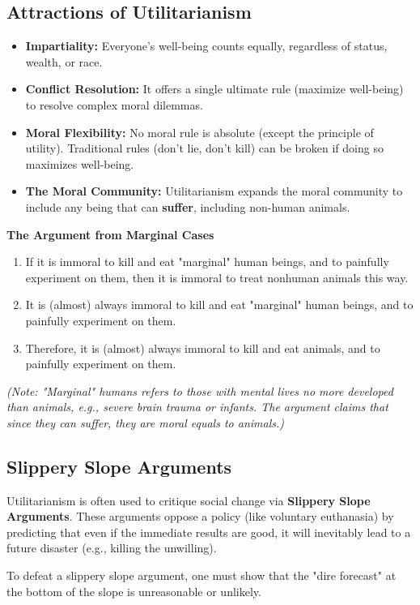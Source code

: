 \subsection{Attractions of Utilitarianism}

\begin{readingnotes}
	\begin{itemize}
		\item \textbf{Impartiality:} Everyone's well-being counts equally, regardless of status, wealth, or race.
		\item \textbf{Conflict Resolution:} It offers a single ultimate rule (maximize well-being) to resolve complex moral dilemmas.
		\item \textbf{Moral Flexibility:} No moral rule is absolute (except the principle of utility). Traditional rules (don't lie, don't kill) can be broken if doing so maximizes well-being.
		\item \textbf{The Moral Community:} Utilitarianism expands the moral community to include any being that can \textbf{suffer}, including non-human animals.
	\end{itemize}
\end{readingnotes}

\begin{argument}
	\textbf{The Argument from Marginal Cases}
	\begin{enumerate}
		\item If it is immoral to kill and eat "marginal" human beings, and to painfully experiment on them, then it is immoral to treat nonhuman animals this way.
		\item It is (almost) always immoral to kill and eat "marginal" human beings, and to painfully experiment on them.
		\item Therefore, it is (almost) always immoral to kill and eat animals, and to painfully experiment on them.
	\end{enumerate}
	\textit{(Note: "Marginal" humans refers to those with mental lives no more developed than animals, e.g., severe brain trauma or infants. The argument claims that since they can suffer, they are moral equals to animals.)}
\end{argument}

\subsection{Slippery Slope Arguments}

\begin{readingnotes}
	Utilitarianism is often used to critique social change via \textbf{Slippery Slope Arguments}.
	These arguments oppose a policy (like voluntary euthanasia) by predicting that even if the immediate results are good, it will inevitably lead to a future disaster (e.g., killing the unwilling).

	To defeat a slippery slope argument, one must show that the "dire forecast" at the bottom of the slope is unreasonable or unlikely.
\end{readingnotes}
